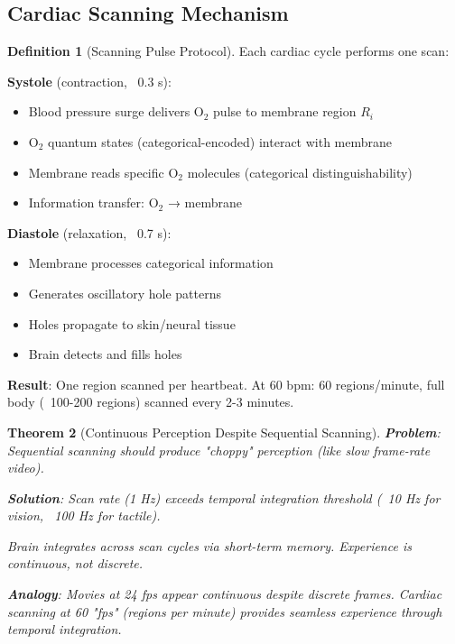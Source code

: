 \documentclass[11pt,a4paper]{article}
\newtheorem{theorem}{Theorem}[section]
\theoremstyle{definition}
\newtheorem{definition}[theorem]{Definition}
\theoremstyle{remark}
\begin{document}
\subsection{Cardiac Scanning Mechanism}

\begin{definition}[Scanning Pulse Protocol]
Each cardiac cycle performs one scan:

\textbf{Systole} (contraction, ~0.3 s):
\begin{itemize}
\item Blood pressure surge delivers O$_2$ pulse to membrane region $R_i$
\item O$_2$ quantum states (categorical-encoded) interact with membrane
\item Membrane reads specific O$_2$ molecules (categorical distinguishability)
\item Information transfer: O$_2$ → membrane
\end{itemize}

\textbf{Diastole} (relaxation, ~0.7 s):
\begin{itemize}
\item Membrane processes categorical information
\item Generates oscillatory hole patterns
\item Holes propagate to skin/neural tissue
\item Brain detects and fills holes
\end{itemize}

\textbf{Result}: One region scanned per heartbeat. At 60 bpm: 60 regions/minute, full body (~100-200 regions) scanned every 2-3 minutes.
\end{definition}

\begin{theorem}[Continuous Perception Despite Sequential Scanning]
\textbf{Problem}: Sequential scanning should produce "choppy" perception (like slow frame-rate video).

\textbf{Solution}: Scan rate (1 Hz) exceeds temporal integration threshold (~10 Hz for vision, ~100 Hz for tactile).

Brain integrates across scan cycles via short-term memory. Experience is continuous, not discrete.

\textbf{Analogy}: Movies at 24 fps appear continuous despite discrete frames. Cardiac scanning at 60 "fps" (regions per minute) provides seamless experience through temporal integration.
\end{theorem}
\end{document}
